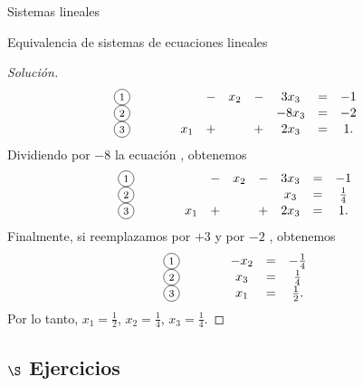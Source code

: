 \begin{chapter}{Sistemas lineales}
\begin{section}{Equivalencia de sistemas de ecuaciones lineales}
\begin{proof}[Solución]
\begin{equation*}
\begin{matrix}
                    \text{\footnotesize\circled{1}}&\qquad&  &-&x_2 &-&3 x_3 &=& -1 \\
                    \text{\footnotesize\circled{2}}&\qquad&  &&  && -8x_3 &=& -2 \\
                    \text{\footnotesize\circled{3}}&\qquad& x_1 &+& &+& 2x_3 &=&   1 .
                    \end{matrix}
                \end{equation*}
                Dividiendo por $-8$ la ecuación  {\footnotesize{}}, obtenemos
                \begin{equation*}
                    \begin{matrix}
                    \text{\footnotesize\circled{1}}&\qquad&  &-&x_2 &-&3 x_3 &=& -1 \\
                    \text{\footnotesize\circled{2}}&\qquad&  &&  && x_3 &=& \frac14 \\
                    \text{\footnotesize\circled{3}}&\qquad& x_1 &+& &+& 2x_3 &=&   1 .
                    \end{matrix}
                \end{equation*} 
                Finalmente, si reemplazamos {\footnotesize{}} por {\footnotesize{}} $+ 3$ {\footnotesize{}} y {\footnotesize{}} por  {\footnotesize{}} $-2$ {\footnotesize{}}, obtenemos 
                \begin{equation*}
                    \begin{matrix}
                    \text{\footnotesize\circled{1}}&\qquad&  -x_2  &=& -\frac14 \\
                    \text{\footnotesize\circled{2}}&\qquad&  x_3 &=& \frac14 \\
                    \text{\footnotesize\circled{3}}&\qquad& x_1  &=&   \frac12 .
                    \end{matrix}
                \end{equation*} 
                Por lo tanto, $x_1 = \frac12$, $x_2 = \frac14$, $x_3 = \frac14$. 
            \end{proof}
            
            \subsection*{$\S$ Ejercicios}


\end{section}
\end{chapter}
